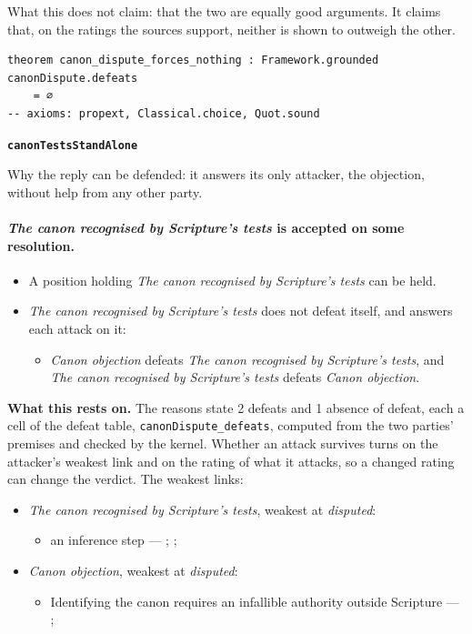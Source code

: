 \documentclass[11pt]{article}
\begin{document}
What this does not claim: that the two are equally good arguments. It claims that, on the ratings the sources support, neither is shown to outweigh the other.

{\small\begin{verbatim}
theorem canon_dispute_forces_nothing : Framework.grounded canonDispute.defeats
    = ∅
-- axioms: propext, Classical.choice, Quot.sound
\end{verbatim}}
\par\medskip\noindent\textbf{\texttt{canon\allowbreak{}Tests\allowbreak{}Stand\allowbreak{}Alone}}\par\nobreak\noindent
Why the reply can be defended: it answers its only attacker, the objection, without help from any other party.

\paragraph{\emph{The canon recognised by Scripture’s tests} is accepted on some resolution.}
\begin{itemize}
\item A position holding \emph{The canon recognised by Scripture’s tests} can be held.
\item \emph{The canon recognised by Scripture’s tests} does not defeat itself, and answers each attack on it:
\begin{itemize}
\item \emph{Canon objection} defeats \emph{The canon recognised by Scripture’s tests}, and \emph{The canon recognised by Scripture’s tests} defeats \emph{Canon objection}.
\end{itemize}
\end{itemize}
\par\noindent\textbf{What this rests on.} The reasons state 2 defeats and 1 absence of defeat, each a cell of the defeat table, \texttt{canon\allowbreak{}Dispute\_\allowbreak{}defeats}, computed from the two parties' premises and checked by the kernel. Whether an attack survives turns on the attacker's weakest link and on the rating of what it attacks, so a changed rating can change the verdict. The weakest links:
\begin{itemize}
\item \emph{The canon recognised by Scripture’s tests}, weakest at \emph{disputed}:
\begin{itemize}
\item an inference step --- \cite[The criterion of inspiration]{reid-canon-new-testament-1908}; \cite[67--87]{kruger-canon-revisited-2012}; \cite[127--129]{mcdonald-integrity-biblical-canon-1996}
\end{itemize}
\item \emph{Canon objection}, weakest at \emph{disputed}:
\begin{itemize}
\item Identifying the canon requires an infallible authority outside Scripture --- \cite[Trent, Session IV (1546), Decree on Sacred Books and Traditions]{tanner-decrees-1990}; \cite[The criterion of inspiration]{reid-canon-new-testament-1908}
\end{itemize}
\end{itemize}
\end{document}
